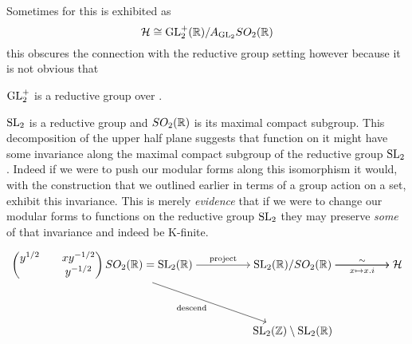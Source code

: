     \begin{remark}
        Sometimes for  this is exhibited as 
        \[\mathcal{H} \cong \GL_2^+(\R)/ A_{\GL_2}SO_2(\R)\]
        this obscures the connection with the reductive group setting however because it is not obvious that 
        \begin{Lemma}
            \(\operatorname{GL}_2^+\) is a reductive group over \Q. 
        \end{Lemma}
    \end{remark}


	
	
	\(\operatorname{SL}_2\) is a reductive group and \(SO_2(\R)\) is its maximal compact subgroup. This decomposition of the upper half plane suggests that function on it might have some invariance along the maximal compact subgroup of the reductive group \(\operatorname{SL}_2\). Indeed if we were to push our modular forms along this isomorphism it would, with the construction that we outlined earlier in terms of a group action on a set, exhibit this invariance. This is merely \textit{evidence} that if we were to change our modular forms to functions on the reductive group \(\operatorname{SL}_2\) they may preserve \textit{some} of that invariance and indeed be K-finite.
    
	\[\begin{tikzcd}[cramped]
		{\begin{pmatrix}y^{1/2} & x y^{-1/2}\\ & y^{-1/2}\end{pmatrix}SO_2(\R)=\SL_2(\R)} && {\SL_2(\R)/SO_2(\R)} && {\mathcal{H}} \\
		\\
		&& {\SL_2(\Z)\setminus\SL_2(\R)}
		\arrow["\sim", from=1-3, to=1-5]
		\arrow["\mathrm{project}", from=1-1, to=1-3]
		\arrow["{x\mapsto x.i}"', from=1-3, to=1-5]
		\arrow["{\text{descend}}"', from=1-1, to=3-3]
	\end{tikzcd}\]

